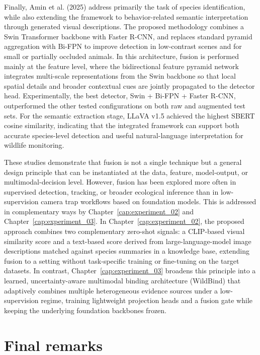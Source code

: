 Finally, Amin et al. (2025) \citep{amin2025automated} address primarily the task of species identification, while also extending the framework to behavior-related semantic interpretation through generated visual descriptions. The proposed methodology combines a Swin Transformer backbone with Faster R-CNN, and replaces standard pyramid aggregation with Bi-FPN to improve detection in low-contrast scenes and for small or partially occluded animals. In this architecture, fusion is performed mainly at the feature level, where the bidirectional feature pyramid network integrates multi-scale representations from the Swin backbone so that local spatial details and broader contextual cues are jointly propagated to the detector head. Experimentally, the best detector, Swin + Bi-FPN + Faster R-CNN, outperformed the other tested configurations on both raw and augmented test sets. For the semantic extraction stage, LLaVA v1.5 achieved the highest SBERT cosine similarity, indicating that the integrated framework can support both accurate species-level detection and useful natural-language interpretation for wildlife monitoring.

These studies demonstrate that fusion is not a single technique but a general design principle that can be instantiated at the data, feature, model-output, or multimodal-decision level. However, fusion has been explored more often in supervised detection, tracking, or broader ecological inference than in low-supervision camera trap workflows based on foundation models. This is addressed in complementary ways by Chapter~\ref{cap:experiment_02} and Chapter~\ref{cap:experiment_03}. In Chapter~\ref{cap:experiment_02}, the proposed approach combines two complementary zero-shot signals: a CLIP-based visual similarity score and a text-based score derived from large-language-model image descriptions matched against species summaries in a knowledge base, extending fusion to a setting without task-specific training or fine-tuning on the target datasets. In contrast, Chapter~\ref{cap:experiment_03} broadens this principle into a learned, uncertainty-aware multimodal binding architecture (WildBind) that adaptively combines multiple heterogeneous evidence sources under a low-supervision regime, training lightweight projection heads and a fusion gate while keeping the underlying foundation backbones frozen.

\section{Final remarks}

